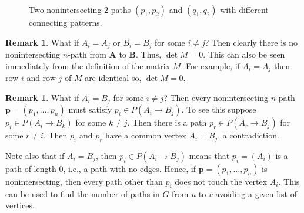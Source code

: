 \documentclass[oneside]{book}
\numberwithin{equation}{section}
\theoremstyle{definition}
\newtheorem{remark}[thm]{Remark}
\renewcommand\vec[1]{\mathbf{#1}}
\begin{document}
\begin{figure}
  \centering
{} \qquad 
{}
\caption{Two nonintersecting \( 2 \)-paths \( (p_1,p_2) \) and
  \( (q_1,q_2) \) with different connecting patterns.}
\label{fig:13}
\end{figure}

\begin{remark}
What if \( A_i=A_j \) or \( B_i=B_j \) for some \( i\ne j \)? Then
clearly there is no nonintersecting \( n \)-path from \( \vec A \)
to \( \vec B \). Thus, \( \det M = 0 \). This can also be seen
immediately from the definition of the matrix \( M \). For example,
if \( A_i=A_j \) then row \( i \) and row \( j \) of \( M \) are
identical so, \( \det M = 0 \).
\end{remark}

\begin{remark}
What if \( A_i=B_j \) for some \( i\ne j \)? Then every
nonintersecting \( n \)-path \( \vec p = (p_1,\dots,p_{n}) \) must
satisfy \( p_i \in P(A_i \to B_j) \). To see this suppose
\( p_i \in P(A_i \to B_k) \) for some \( k\ne j \). Then there is a
path \( p_r\in P(A_r\to B_j) \) for some \( r\ne i \). Then \( p_i \)
and \( p_r \) have a common vertex \( A_i = B_j \), a
contradiction.

Note also that if \( A_i=B_j \), then \( p_i \in P(A_i \to B_j) \)
means that \( p_i=(A_i) \) is a path of length \( 0 \), i.e., a path
with no edges. Hence, if \( \vec p = (p_1,\dots,p_{n}) \) is
nonintersecting, then every path other than \( p_i \) does not touch
the vertex \( A_i \). This can be used to find the number of paths
in \( G \) from \( u \) to \( v \) avoiding a given list of
vertices.
\end{remark}
\end{document}
